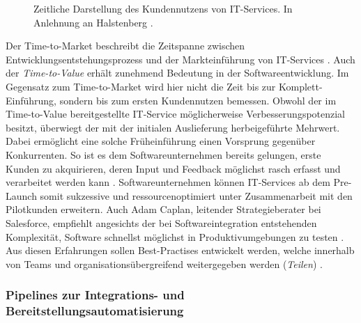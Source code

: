 \begin{center}
	\begin{figure}[H]
		\centering
		\caption[Zeitliche Darstellung des Kundennutzens von IT-Services]{Zeitliche Darstellung des Kundennutzens von IT-Services. In Anlehnung an Halstenberg \cite[9]{Halstenberg.2020}.}
		\label{fig:TTM}
	\end{figure}
\end{center}
\vspace*{-15mm}
Der Time-to-Market beschreibt die Zeitspanne zwischen Entwicklungsentstehungsprozess und der Markteinführung von IT-Services \cite[141]{Vesey.1992}. Auch der \textit{Time-to-Value} erhält zunehmend Bedeutung in der Softwareentwicklung. Im Gegensatz zum Time-to-Market wird hier nicht die Zeit bis zur Komplett-Einführung, sondern bis zum ersten Kundennutzen bemessen. Obwohl der im Time-to-Value bereitgestellte IT-Service möglicherweise Verbesserungspotenzial besitzt, überwiegt der mit der initialen Auslieferung herbeigeführte Mehrwert. Dabei ermöglicht eine solche Früheinführung einen Vorsprung gegenüber Konkurrenten. So ist es dem Softwareunternehmen bereits gelungen, erste Kunden zu akquirieren, deren Input und Feedback möglichst rasch erfasst und verarbeitet werden kann \cite[9]{Halstenberg.2020}. Softwareunternehmen können IT-Services ab dem Pre-Launch somit sukzessive und ressourcenoptimiert unter Zusammenarbeit mit den Pilotkunden erweitern. Auch Adam Caplan, leitender Strategieberater bei Salesforce, empfiehlt angesichts der bei Softwareintegration entstehenden Komplexität, Software schnellst möglichst in Produktivumgebungen zu testen \cite{Vesey.1992}. Aus diesen Erfahrungen sollen Best-Practises entwickelt werden, welche innerhalb von Teams und organisationsübergreifend weitergegeben werden (\textit{Teilen}) \cite[7]{Halstenberg.2020}. 

\subsubsection{Pipelines zur Integrations- und Bereitstellungsautomatisierung}

